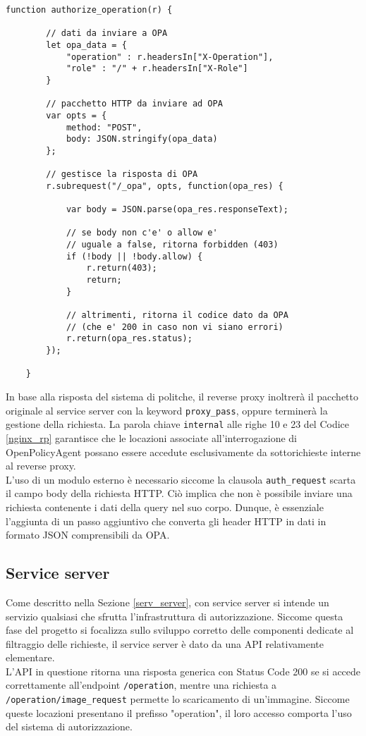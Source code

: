 \begin{lstlisting}[caption={Frammento di codice del modulo NJS},captionpos=b,label=NJS]
    function authorize_operation(r) {

        // dati da inviare a OPA
        let opa_data = {
            "operation" : r.headersIn["X-Operation"],
            "role" : "/" + r.headersIn["X-Role"]
        }
    
        // pacchetto HTTP da inviare ad OPA
        var opts = {
            method: "POST",
            body: JSON.stringify(opa_data)
        };
        
        // gestisce la risposta di OPA
        r.subrequest("/_opa", opts, function(opa_res) {
    
            var body = JSON.parse(opa_res.responseText);
            
            // se body non c'e' o allow e' 
            // uguale a false, ritorna forbidden (403)
            if (!body || !body.allow) {
                r.return(403);
                return;
            }

            // altrimenti, ritorna il codice dato da OPA 
            // (che e' 200 in caso non vi siano errori)
            r.return(opa_res.status);
        });
    
    }
\end{lstlisting}
In base alla risposta del sistema di politche, il reverse proxy inoltrerà il pacchetto originale al service server con la keyword \texttt{proxy\_pass}, 
oppure terminerà la gestione della richiesta.
La parola chiave \texttt{internal} alle righe 10 e 23 del Codice \ref{nginx_rp}  garantisce che le locazioni 
associate all'interrogazione di OpenPolicyAgent possano essere accedute esclusivamente da sottorichieste interne al reverse proxy. 
\\ L'uso di un modulo esterno è necessario siccome la clausola \texttt{auth\_request} scarta il campo body della 
richiesta HTTP. Ciò implica che non è possibile inviare una richiesta contenente i dati della query nel suo corpo.
Dunque, è essenziale l'aggiunta di un passo aggiuntivo che converta gli header HTTP in dati in formato
JSON comprensibili da OPA. 


\subsection{Service server}
Come descritto nella Sezione \ref*{serv_server}, con service server si intende un servizio qualsiasi che sfrutta 
l'infrastruttura di autorizzazione. 
Siccome questa fase del progetto si focalizza sullo sviluppo corretto delle componenti dedicate 
al filtraggio delle richieste, il service server è dato da una API relativamente elementare. \\
L'API in questione ritorna una risposta generica con Status Code 200 se si accede correttamente all'endpoint \texttt{/operation}, 
mentre una richiesta a \texttt{/operation/image\_request} permette lo scaricamento di 
un'immagine. Siccome queste locazioni presentano il prefisso "operation", il loro accesso comporta l'uso 
del sistema di autorizzazione.  


